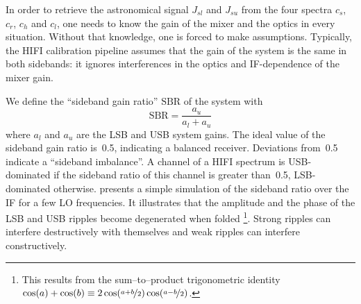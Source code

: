 In order to retrieve the astronomical signal $J_{sl}$ and  $J_{su}$
from the four spectra $c_s$, $c_r$, $c_h$ and $c_l$, one needs to know the gain of the mixer and the optics in every situation.
Without that knowledge, one is forced to make assumptions.
Typically, the HIFI calibration pipeline assumes that the gain of the system is the same in both sidebands: it ignores interferences in the optics and IF-dependence of the mixer gain.

We define the ``sideband gain ratio'' $\text{SBR}$ of the system with
\begin{equation}
    \text{SBR} = \frac{a_u}{a_l + a_u} \label{eq:sbr}
\end{equation}
where $a_l$ and $a_u$ are the LSB and USB system gains.
The ideal value of the sideband gain ratio is~\num{0.5}, indicating a balanced receiver.
Deviations from~\num{0.5} indicate a ``sideband imbalance''.
A channel of a HIFI spectrum is USB-dominated if the sideband ratio of this channel is greater than~\num{0.5}, LSB-dominated otherwise.
 presents a simple simulation of the sideband ratio over the IF for a few LO frequencies.
It illustrates that the amplitude and the phase of the LSB and USB ripples become degenerated when folded \footnote{This results from the sum--to--product trigonometric identity~$\cos(a)+\cos(b) \equiv 2 \cos(\nicefrac{a+b}{2}) \cos(\nicefrac{a-b}{2})$.}.
Strong ripples can interfere destructively with themselves and weak ripples can interfere constructively.

